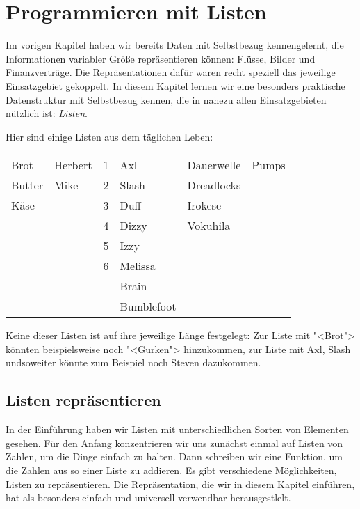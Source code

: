 
\chapter{Programmieren mit Listen}
\label{cha:rek}

Im vorigen Kapitel haben wir bereits Daten mit Selbstbezug
kennengelernt, die Informationen variabler Größe repräsentieren
können: Flüsse, Bilder und Finanzverträge.  Die Repräsentationen dafür
waren recht speziell das jeweilige Einsatzgebiet gekoppelt.  In diesem
Kapitel lernen wir eine besonders praktische Datenstruktur mit
Selbstbezug kennen, die in nahezu allen Einsatzgebieten nützlich ist:
\textit{Listen}.

Hier sind einige Listen aus dem täglichen Leben:
%
\begin{center}
  \begin{tabular}{l@{\qquad}l@{\qquad}l@{\qquad}l@{\qquad}l@{\qquad}l}
  Brot & Herbert & 1 & Axl & Dauerwelle & Pumps \\
  Butter & Mike & 2 & Slash & Dreadlocks \\
  Käse & & 3 & Duff & Irokese \\
  & & 4 & Dizzy & Vokuhila \\
  && 5 & Izzy \\
  && 6 & Melissa \\
  &&& Brain\\
  &&& Bumblefoot 
\end{tabular}
\end{center}
%
Keine dieser Listen ist auf ihre jeweilige Länge festgelegt: Zur Liste
mit "<Brot"> könnten beispielsweise noch "<Gurken"> hinzukommen, zur
Liste mit Axl, Slash undsoweiter könnte zum Beispiel noch Steven
dazukommen.

\section{Listen repräsentieren}

In der Einführung haben wir Listen mit unterschiedlichen Sorten von
Elementen gesehen.  Für den Anfang konzentrieren wir uns zunächst
einmal auf Listen von Zahlen, um die Dinge einfach zu halten.  Dann
schreiben wir eine Funktion, um die Zahlen aus so einer Liste zu
addieren. Es gibt verschiedene Möglichkeiten, Listen zu
repräsentieren.  Die Repräsentation, die wir in diesem Kapitel
einführen, hat als besonders einfach und universell verwendbar
herausgestlelt.

